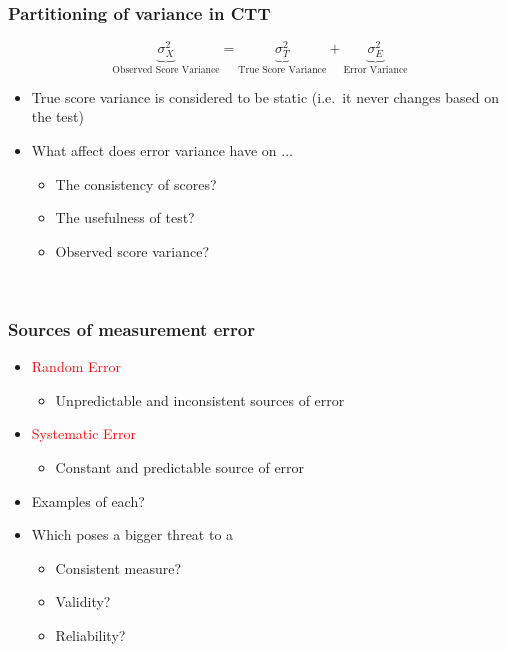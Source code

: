 \documentclass[dvipsnames]{beamer}\usepackage[]{graphicx}\usepackage[]{color}
\begin{document}
\begin{frame}
\frametitle{Partitioning of variance in CTT}
$$\underbrace{\sigma^2_X}_{\text{Observed Score Variance}} = \underbrace{\sigma^2_T}_{\text{True Score Variance}} + \underbrace{\sigma^2_E}_{\text{Error Variance}}$$
\begin{itemize}
  \item<2-> True score variance is considered to be static (i.e.\ it never changes based on the test)
  \item<3-> What affect does error variance have on ...
    \begin{itemize}
      \item<4-> The consistency of scores?
      \item<5-> The usefulness of test?
      \item<6-> Observed score variance?
    \end{itemize}
\end{itemize}
\end{frame}

{
\begin{frame}
\centering
\Huge \textcolor{white}{What goes into error variance?}
\end{frame}
}

\begin{frame}
\frametitle{Sources of measurement error}
\begin{itemize}
\item<1->\textcolor{red}{Random Error}
  \begin{itemize}
  \item<2-> Unpredictable and inconsistent sources of error
  \end{itemize}
\item<3->\textcolor{red}{Systematic Error}
  \begin{itemize}
  \item<4->Constant and predictable source of error
  \end{itemize}
\item<5->Examples of each?
\item<6->Which poses a bigger threat to a
  \begin{itemize} 
    \item<7-> Consistent measure?
    \item<8-> Validity?
    \item<9-> Reliability?
  \end{itemize}
\end{itemize}
\end{frame}
\end{document}
